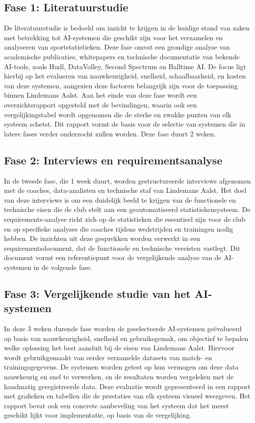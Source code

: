 \subsection{Fase 1: Literatuurstudie}
De literatuurstudie is bedoeld om inzicht te krijgen in de huidige stand van zaken met betrekking tot AI-systemen die geschikt zijn voor het verzamelen en analyseren van sportstatistieken. Deze fase omvat een grondige analyse van academische publicaties, whitepapers en technische documentatie van bekende AI-tools, zoals Hudl, DataVolley, Second Spectrum en Balltime AI. De focus ligt hierbij op het evalueren van nauwkeurigheid, snelheid, schaalbaarheid, en kosten van deze systemen, aangezien deze factoren belangrijk zijn voor de toepassing binnen Lindemans Aalst. Aan het einde van deze fase wordt een overzichtsrapport opgesteld met de bevindingen, waarin ook een vergelijkingstabel wordt opgenomen die de sterke en zwakke punten van elk systeem schetst. Dit rapport vormt de basis voor de selectie van systemen die in latere fases verder onderzocht zullen worden. Deze fase duurt 2 weken.
\subsection{Fase 2: Interviews en requirementsanalyse}
In de tweede fase, die 1 week duurt, worden gestructureerde interviews afgenomen met de coaches, data-analisten en technische staf van Lindemans Aalst. Het doel van deze interviews is om een duidelijk beeld te krijgen van de functionele en technische eisen die de club stelt aan een geautomatiseerd statistiekensysteem. De requirements-analyse richt zich op de statistieken die essentieel zijn voor de club en op specifieke analyses die coaches tijdens wedstrijden en trainingen nodig hebben. De inzichten uit deze gesprekken worden verwerkt in een requirementsdocument, dat de functionele en technische vereisten vastlegt. Dit document vormt een referentiepunt voor de vergelijkende analyse van de AI-systemen in de volgende fase.
\subsection{Fase 3: Vergelijkende studie van het AI-systemen}
In deze 3 weken durende fase worden de geselecteerde AI-systemen geëvalueerd op basis van nauwkeurigheid, snelheid en gebruiksgemak, om objectief te bepalen welke oplossing het best aansluit bij de eisen van Lindemans Aalst. Hiervoor wordt gebruikgemaakt van eerder verzamelde datasets van match- en trainingsgegevens. De systemen worden getest op hun vermogen om deze data nauwkeurig en snel te verwerken, en de resultaten worden vergeleken met de handmatig geregistreerde data. Deze evaluatie wordt gepresenteerd in een rapport met grafieken en tabellen die de prestaties van elk systeem visueel weergeven. Het rapport bevat ook een concrete aanbeveling van het systeem dat het meest geschikt lijkt voor implementatie, op basis van de vergelijking.
